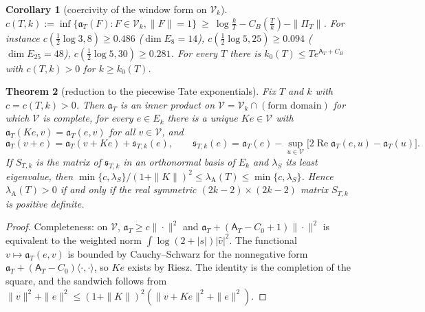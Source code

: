 \documentclass[11pt]{amsart}
\newtheorem{theorem}{Theorem}[section]
\newtheorem{corollary}[theorem]{Corollary}
\theoremstyle{definition}
\theoremstyle{remark}
\newcommand{\Rel}{\operatorname{Re}}
\newcommand{\Aconst}{\mathsf A_T}
\newcommand{\PiT}{\Pi_T}
\newcommand{\lamA}{\lambda_{\mathrm A}}
\begin{document}
\begin{corollary}[coercivity of the window form on $\mathcal V_k$]\label{cor:L1}
$c(T,k):=\inf\{\mathfrak a_T(F):F\in\mathcal V_k,\|F\|=1\}\ \ge\ \log\frac kT-C_B(\frac Tk)-\|\PiT\|$. For instance
$c(\frac12\log3,8)\ge0.486$ ($\dim E_8=14$), $c(\frac12\log5,25)\ge0.094$ ($\dim E_{25}=48$), $c(\frac12\log5,30)\ge0.281$.
For every $T$ there is $k_0(T)\le Te^{\Aconst+C_B}$ with $c(T,k)>0$ for $k\ge k_0(T)$.
\end{corollary}

\begin{theorem}[reduction to the piecewise Tate exponentials]\label{thm:schur}
Fix $T$ and $k$ with $c=c(T,k)>0$. Then $\mathfrak a_T$ is an inner product on $\mathcal V=\mathcal V_k\cap(\text{form domain})$
for which $\mathcal V$ is complete, for every $e\in E_k$ there is a unique $Ke\in\mathcal V$ with
$\mathfrak a_T(Ke,v)=\mathfrak a_T(e,v)$ for all $v\in\mathcal V$, and
\[
\mathfrak a_T(v+e)=\mathfrak a_T(v+Ke)+\mathfrak s_{T,k}(e),\qquad
\mathfrak s_{T,k}(e)=\mathfrak a_T(e)-\sup_{u\in\mathcal V}\big[2\Rel\mathfrak a_T(e,u)-\mathfrak a_T(u)\big].
\]
If $S_{T,k}$ is the matrix of $\mathfrak s_{T,k}$ in an orthonormal basis of $E_k$ and $\lambda_S$ its least eigenvalue, then
$\min\{c,\lambda_S\}/(1+\|K\|)^2\le\lamA(T)\le\min\{c,\lambda_S\}$. Hence $\lamA(T)>0$ if and only if the real symmetric
$(2k-2)\times(2k-2)$ matrix $S_{T,k}$ is positive definite.
\end{theorem}
\begin{proof}
Completeness: on $\mathcal V$, $\mathfrak a_T\ge c\|\cdot\|^2$ and $\mathfrak a_T+(\Aconst-C_0+1)\|\cdot\|^2$ is equivalent to the
weighted norm $\int\log(2+|s|)|\widehat v|^2$. The functional $v\mapsto\mathfrak a_T(e,v)$ is bounded by Cauchy--Schwarz for the
nonnegative form $\mathfrak a_T+(\Aconst-C_0)\langle\cdot,\cdot\rangle$, so $Ke$ exists by Riesz. The identity is the completion of
the square, and the sandwich follows from $\|v\|^2+\|e\|^2\le(1+\|K\|)^2(\|v+Ke\|^2+\|e\|^2)$.
\end{proof}
\end{document}
